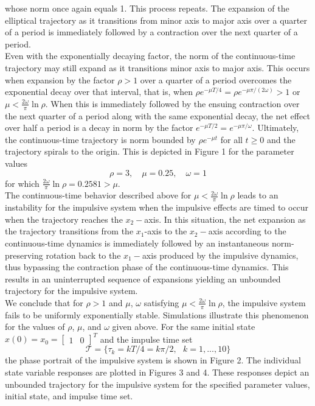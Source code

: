 \documentclass[11pt,a4paper]{article}
\begin{document}
whose norm once again equals 1.
This process repeats. The expansion of the elliptical trajectory as it transitions from minor axis to major axis over a quarter of a period
is immediately followed by a contraction over the next quarter of a period.\\

Even with the exponentially decaying factor, the norm of the continuous-time trajectory may still expand as it transitions minor axis to major axis.
This occurs when expansion by the factor $\rho > 1$ over a quarter of a period overcomes the exponential decay over that interval, that is, when
$\rho e^{-\mu T/4} = \rho e^{-\mu \pi / (2 \omega)} > 1$ or $\mu < \frac{2 \omega}{\pi} \ln \rho$.
When this is immediately followed by the ensuing contraction over the next quarter of a period along with the same exponential decay, the net effect over
half a period is a decay in norm by the factor $e^{-\mu T/2} = e^{-\mu \pi / \omega}$.
Ultimately, the continuous-time trajectory is norm bounded by $\rho e^{-\mu t}$ for all $t \ge 0$ and the trajectory spirals to the origin.
This is depicted in Figure 1 for the parameter values
\begin{equation*}
\rho = 3, \quad \mu = 0.25, \quad \omega =1
\end{equation*}
for which $\frac{2 \omega}{\pi} \ln \rho = 0.2581 > \mu$.\\

The continuous-time behavior described above for $\mu < \frac{2 \omega}{\pi} \ln \rho$ leads to an instability for the impulsive system when the
impulsive effects are timed to occur when the trajectory reaches the $x_2-$axis.
In this situation, the net expansion as the trajectory transitions from the $x_1$-axis to the $x_2-$axis according to the continuous-time dynamics
is immediately followed by an instantaneous norm-preserving
rotation back to the $x_1-$axis produced by the impulsive dynamics, thus bypassing the contraction phase of the continuous-time dynamics.
This results in an uninterrupted sequence of expansions yielding an unbounded trajectory for the impulsive system.\\

We conclude that for $\rho > 1$ and $\mu$, $\omega$ satisfying $\mu < \frac{2 \omega}{\pi} \ln \rho$, the impulsive system fails to be uniformly exponentially stable.
Simulations illustrate this phenomenon for the values of $\rho$, $\mu$, and $\omega $ given above.
For the same initial state $x(0) = x_0 = [ \begin{array}{cc} 1 & 0 \end{array} ]^T$
and the impulse time set
\begin{equation*}
\mathcal{T} = \{ \tau_k = k T/4 = k \pi/2 , \text{ } k = 1,...,10 \}
\end{equation*}
the phase portrait of the impulsive system is shown in Figure 2.
The individual state variable responses are plotted in Figures 3 and 4.
These responses depict an unbounded trajectory for the impulsive system for the specified
parameter values, initial state, and impulse time set.\\
\end{document}

